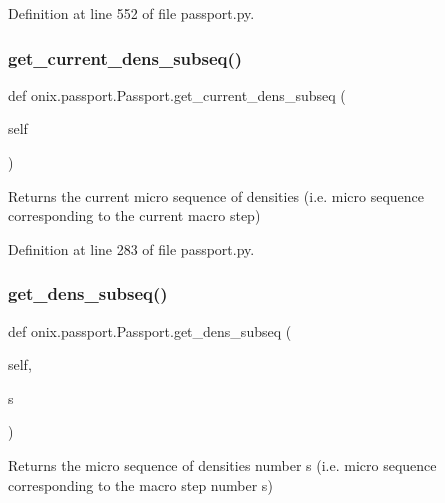 Definition at line 552 of file passport.\+py.

\mbox{\label{classonix_1_1passport_1_1Passport_a10f90a32e5c4f90e59c82fcc0c757af6}} 
\subsubsection{\texorpdfstring{get\+\_\+current\+\_\+dens\+\_\+subseq()}{get\_current\_dens\_subseq()}}
{\footnotesize\ttfamily def onix.\+passport.\+Passport.\+get\+\_\+current\+\_\+dens\+\_\+subseq (\begin{DoxyParamCaption}\item[{}]{self }\end{DoxyParamCaption})}

\begin{DoxyVerb}Returns the current micro sequence of densities (i.e. micro sequence corresponding to the current macro step)\end{DoxyVerb}
 

Definition at line 283 of file passport.\+py.

\mbox{\label{classonix_1_1passport_1_1Passport_afc8cf13faa2b745994dc7b93fff4d990}} 
\subsubsection{\texorpdfstring{get\+\_\+dens\+\_\+subseq()}{get\_dens\_subseq()}}
{\footnotesize\ttfamily def onix.\+passport.\+Passport.\+get\+\_\+dens\+\_\+subseq (\begin{DoxyParamCaption}\item[{}]{self,  }\item[{}]{s }\end{DoxyParamCaption})}

\begin{DoxyVerb}Returns the micro sequence of densities number s (i.e. micro sequence corresponding to the macro step number s)\end{DoxyVerb}
 

